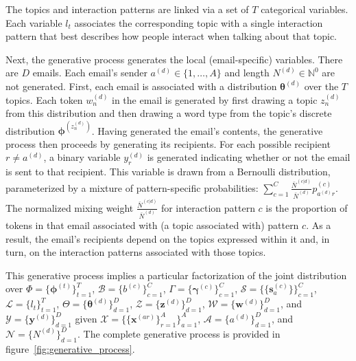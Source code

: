 \documentclass{pnastwo}
\newcommand{\bs}{\boldsymbol{s}}
\newcommand{\bw}{\boldsymbol{w}}
\newcommand{\bx}{\boldsymbol{x}}
\newcommand{\by}{\boldsymbol{y}}
\newcommand{\bz}{\boldsymbol{z}}
\newcommand{\bgamma}{\boldsymbol{\gamma}}
\newcommand{\bphi}{\boldsymbol{\phi}}
\newcommand{\btheta}{\boldsymbol{\theta}}
\begin{document}
\begin{article}
The topics and interaction patterns are linked via a set of $T$
categorical variables. Each variable $l_t$ associates the
corresponding topic with a single interaction pattern that best
describes how people interact when talking about that topic.

Next, the generative process generates the local (email-specific)
variables. There are $D$ emails. Each email's sender $a^{(d)} \in \{1,
\ldots, A\}$ and length $N^{(d)} \in \mathbb{N}^0$ are not
generated. First, each email is associated with a distribution
$\btheta^{(d)}$ over the $T$ topics. Each token $w_n^{(d)}$ in the
email is generated by first drawing a topic $z_n^{(d)}$ from this
distribution and then drawing a word type from the topic's discrete
distribution $\bphi^{(z_n^{(d)})}$. Having generated the email's
contents, the generative process then proceeds by generating its
recipients. For each possible recipient $r \neq a^{(d)}$, a binary
variable $y^{(d)}_r$ is generated indicating whether or not the email
is sent to that recipient. This variable is drawn from a Bernoulli
distribution, parameterized by a mixture of pattern-specific
probabilities: $\sum_{c=1}^C \frac{\bar{N}^{(c|d)}}{\bar{N}^{(d)}}
p^{(c)}_{a^{(d)}r}$. The normalized mixing weight
$\frac{\bar{N}^{(c|d)}}{\bar{N}^{(d)}}$ for interaction pattern $c$ is
the proportion of tokens in that email associated with (a topic
associated with) pattern $c$. As a result, the email's recipients
depend on the topics expressed within it and, in turn, on the
interaction patterns associated with those topics.

This generative process implies a particular factorization of the
joint distribution over $\Phi = \{ \bphi^{(t)} \}_{t=1}^T$,
$\mathcal{B} = \{ b^{(c)} \}_{c=1}^C$, $\Gamma = \{ \bgamma^{(c)}
\}_{c=1}^C$, $\mathcal{S} = \{ \{ \bs^{(c)}_a \} \}_{c=1}^C$,
$\mathcal{L} = \{ l_t\}_{t=1}^T$, $\Theta = \{ \btheta^{(d)}
\}_{d=1}^D$, $\mathcal{Z} = \{ \bz^{(d)} \}_{d=1}^D$, $\mathcal{W} =
\{ \bw^{(d)} \}_{d=1}^D$, and $\mathcal{Y} = \{ \by^{(d)} \}_{d=1}^D$
given $\mathcal{X} = \{ \{ \bx^{(ar)} \}_{r=1}^A \}_{a=1}^A$,
$\mathcal{A} = \{ a^{(d)} \}_{d=1}^D$, and $\mathcal{N} = \{ N^{(d)}
\}_{d=1}^D$. The complete generative process is provided in
figure~\ref{fig:generative_process}.


\end{article}
\end{document}
